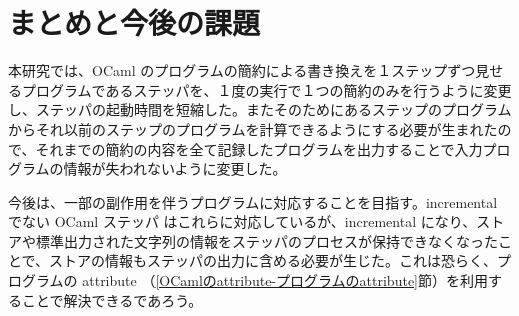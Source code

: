 

\section{まとめと今後の課題}

本研究では、OCaml のプログラムの簡約による書き換えを１ステップずつ見せるプログラムであるステッパを、１度の実行で１つの簡約のみを行うように変更し、ステッパの起動時間を短縮した。またそのためにあるステップのプログラムからそれ以前のステップのプログラムを計算できるようにする必要が生まれたので、それまでの簡約の内容を全て記録したプログラムを出力することで入力プログラムの情報が失われないように変更した。

今後は、一部の副作用を伴うプログラムに対応することを目指す。incremental でない OCaml ステッパ\cite{FSA18} はこれらに対応しているが、incremental になり、ストアや標準出力された文字列の情報をステッパのプロセスが保持できなくなったことで、ストアの情報もステッパの出力に含める必要が生じた。これは恐らく、プログラムの attribute （\ref{OCamlのattribute-プログラムのattribute}節）を利用することで解決できるであろう。
